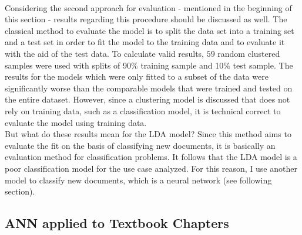 \documentclass[11pt,a4paper]{article}
\begin{document}
\ \\
Considering the second approach for evaluation - mentioned in the beginning of this section - results regarding this procedure should be discussed as well. The classical method to evaluate the model is to split the data set into a training set and a test set in order to fit the model to the training data and to evaluate it with the aid of the test data. To calculate valid results, $59$ random clustered samples were used with splits of 90\% training sample and 10\% test sample. The results for the models which were only fitted to a subset of the data were significantly worse than the comparable models that were trained and tested on the entire dataset. However, since a clustering model is discussed that does not rely on training data, such as a classification model, it is technical correct to evaluate the model using training data.\\
But what do these results mean for the LDA model? Since this method aims to evaluate the fit on the basis of classifying new documents, it is basically an evaluation method for classification problems. It follows that the LDA model is a poor classification model for the use case analyzed. For this reason, I use another model to classify new documents, which is a neural network (see following section).

\subsection{ANN applied to Textbook Chapters} \label{sec:ANN.example}
\end{document}
